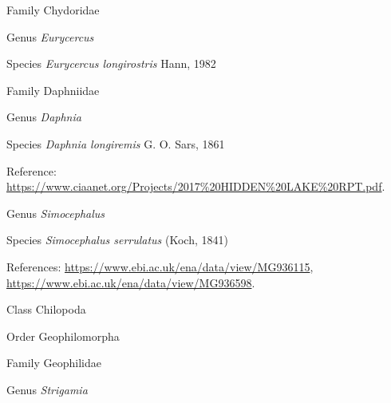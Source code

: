 \documentclass[9pt, article]{memoir}
\begin{document}
\begin{multicols}{2}
\vspace{6pt}\noindent\hspace{24pt}Family Chydoridae


\vspace{6pt}\noindent\hspace{30pt}Genus \textit{Eurycercus}


\vspace{6pt}\noindent\hspace{36pt}Species \textit{Eurycercus longirostris} Hann, 1982


\vspace{6pt}\noindent\hspace{24pt}Family Daphniidae


\vspace{6pt}\noindent\hspace{30pt}Genus \textit{Daphnia}


\vspace{6pt}\noindent\hspace{36pt}Species \textit{Daphnia longiremis} G. O. Sars, 1861


\vspace{6pt}Reference: 
\url{https://www.ciaanet.org/Projects/2017%20HIDDEN%20LAKE%20RPT.pdf}.

\vspace{6pt}\noindent\hspace{30pt}Genus \textit{Simocephalus}


\vspace{6pt}\noindent\hspace{36pt}Species \textit{Simocephalus serrulatus} (Koch, 1841)


\vspace{6pt}References: 
\url{https://www.ebi.ac.uk/ena/data/view/MG936115}, 
\url{https://www.ebi.ac.uk/ena/data/view/MG936598}.

\vspace{6pt}\noindent\hspace{12pt}Class Chilopoda


\vspace{6pt}\noindent\hspace{18pt}Order Geophilomorpha


\vspace{6pt}\noindent\hspace{24pt}Family Geophilidae


\vspace{6pt}\noindent\hspace{30pt}Genus \textit{Strigamia}



\end{multicols}
\end{document}
